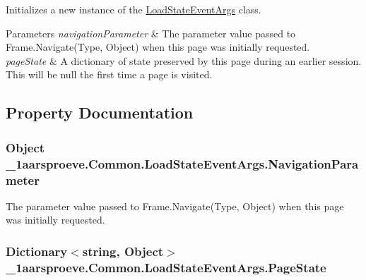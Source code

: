 Initializes a new instance of the \hyperlink{class__1aarsproeve_1_1_common_1_1_load_state_event_args}{Load\+State\+Event\+Args} class. 


\begin{DoxyParams}{Parameters}
{\em navigation\+Parameter} & The parameter value passed to Frame.\+Navigate(\+Type, Object) when this page was initially requested. \\
\hline
{\em page\+State} & A dictionary of state preserved by this page during an earlier session. This will be null the first time a page is visited. \\
\hline
\end{DoxyParams}


\subsection{Property Documentation}
\hypertarget{class__1aarsproeve_1_1_common_1_1_load_state_event_args_a644716fac854626a88aa069be7987842}{}
\subsubsection[{Navigation\+Parameter}]{\setlength{\rightskip}{0pt plus 5cm}Object \+\_\+1aarsproeve.\+Common.\+Load\+State\+Event\+Args.\+Navigation\+Parameter\hspace{0.3cm}{\ttfamily [get]}}\label{class__1aarsproeve_1_1_common_1_1_load_state_event_args_a644716fac854626a88aa069be7987842}


The parameter value passed to Frame.\+Navigate(\+Type, Object) when this page was initially requested. 

\hypertarget{class__1aarsproeve_1_1_common_1_1_load_state_event_args_a4578acd8233a23b822bd76aae343b720}{}
\subsubsection[{Page\+State}]{\setlength{\rightskip}{0pt plus 5cm}Dictionary$<$string, Object$>$ \+\_\+1aarsproeve.\+Common.\+Load\+State\+Event\+Args.\+Page\+State\hspace{0.3cm}{\ttfamily [get]}}\label{class__1aarsproeve_1_1_common_1_1_load_state_event_args_a4578acd8233a23b822bd76aae343b720}


